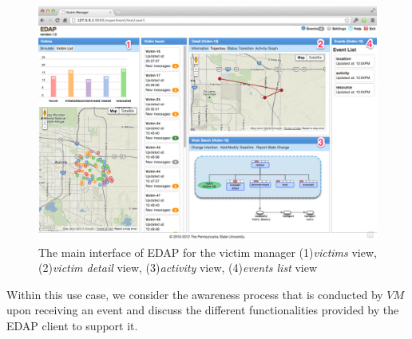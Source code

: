 \begin{figure}[htbp] %
	\centering
	\includegraphics[width=5.8in]{vm_interface_initial_marked.jpg} 
	\caption{The main interface of EDAP for the victim manager \newline (1)\emph{victims} view, (2)\emph{victim detail} view, (3)\emph{activity} view, (4)\emph{events list} view}
	\label{fig:vm_interface_initial}
\end{figure}

Within this use case, we consider the awareness process that is conducted by $VM$ upon receiving an event and discuss the different functionalities provided by the EDAP client to support it. 

